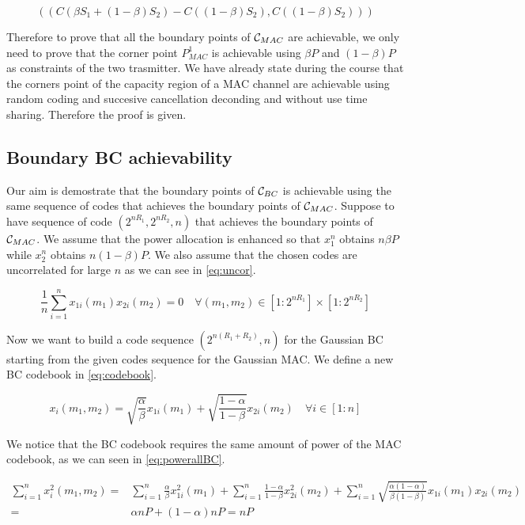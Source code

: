 \begin{equation}
	(\left( C (\beta S_1 + (1-\beta)S_2) - C((1-\beta)S_2) , C \left( (1-\beta)S_2 \right) \right))
	\label{eq:boundmac}
\end{equation}

Therefore to prove that all the boundary points of $\mathcal{C}_{MAC}$ are achievable, we only need to prove that the corner point $P_{MAC}^1$ is achievable using $\beta P$ and $(1-\beta) P$ as constraints of the two trasmitter. We have already state during the course that the corners point of the capacity region of a MAC channel are achievable using random coding and succesive cancellation deconding and without use time sharing. Therefore the proof is given.

\subsection{Boundary BC achievability}

Our aim is demostrate that the boundary points of $\mathcal{C}_{BC}$ is achievable using the same sequence of codes that achieves the boundary points of $\mathcal{C}_{MAC}$. Suppose to have sequence of code $(2^{nR_1}, 2^{nR_2}, n)$ that achieves the boundary points of $\mathcal{C}_{MAC}$. We assume that the power allocation is enhanced so that $x_1^n$ obtains $n \beta P$ while $x_2^n$ obtains $n (1-\beta) P$. We also assume that the chosen codes are uncorrelated for large $n$ as we can see in \eqref{eq:uncor}.

\begin{equation}
	\frac{1}{n}\sum_{i=1}^n x_{1i}(m_1) x_{2i} (m_2)= 0 \quad \forall (m_1,m_2) \in [1:2^{nR_1}]\times[1:2^{nR_2}]
	\label{eq:uncor}
\end{equation}

Now we want to build a code sequence $(2^{n(R_1+R_2)},n)$ for the Gaussian BC starting from the given codes sequence for the Gaussian MAC. We define a new BC codebook in \eqref{eq:codebook}.

\begin{equation}
	x_i(m_1,m_2)= \sqrt{\frac{\alpha}{\beta}}x_{1i}(m_1)+\sqrt{\frac{1-\alpha}{1-\beta}}x_{2i}(m_2) \quad \forall i \in [1:n]
	\label{eq:codebook}
\end{equation}

We notice that the BC codebook requires the same amount of power of the MAC codebook, as we can seen in \eqref{eq:powerallBC}.

\begin{equation}
	\begin{aligned}
		\sum_{i=1}^n x_i^2(m_1,m_2) = & \sum_{i=1}^n \frac{\alpha}{\beta} x_{1i}^2(m_1) + \sum_{i=1}^n \frac{1-\alpha}{1-\beta} x_{2i}^2(m_2) + \sum_{i=1}^n \sqrt{\frac{\alpha(1-\alpha)}{\beta(1-\beta)}} x_{1i}(m_1) x_{2i}(m_2)\\
		= & \alpha nP + (1-\alpha) nP = nP
	\end{aligned}
	\label{eq:powerallBC}
\end{equation}

